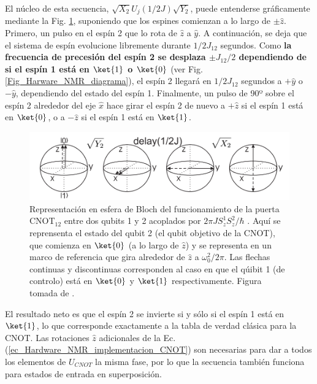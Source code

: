 El núcleo de esta secuencia, $\sqrt{X_2} U_j (1/2J) \sqrt{Y_2}$, puede entenderse gráficamente mediante la Fig. \ref{Fig_Harware_NMR_implementacion_CNOT}, suponiendo que los espines comienzan a lo largo de $\pm \hat{z}$. Primero, un pulso en el espín 2 que lo rota de $\hat{z}$ a $\hat{y}$. A continuación, se deja que el sistema de espín evolucione libremente durante $1/2J_{12}$ segundos. Como \textbf{la frecuencia de precesión del espín 2 se desplaza $\pm J_{12}/2$ dependiendo de si el espín 1 está en $\ket{1}$ o $\ket{0}$} (ver Fig. \ref{Fig_Harware_NMR_diagrama}), el espín 2 llegará en $1/2J_{12}$ segundos a $+\hat{y}$ o $- \hat{y}$, dependiendo del estado del espín 1. Finalmente, un pulso de 90º sobre el espín 2 alrededor del eje $\hat{x}$ hace girar el espín 2 de nuevo a $+\hat{z}$ si el espín 1 está en $\ket {0}$, o a $-\hat{z}$ si el espín 1 está en $\ket{1}$.

	\begin{figure}[H]
	\centering 
	\includegraphics[width=0.7\linewidth]{Figuras/Fig_Harware_NMR_implementacion_CNOT.png}
	\caption{Representación en esfera de Bloch del funcionamiento de la puerta CNOT$_{12}$ entre dos qubits 1 y 2 acoplados por $2 \pi J S_z^1S_z^2/\hbar$ . Aquí se reprensenta el estado del qubit 2 (el qubit objetivo de la CNOT), que comienza en $\ket{0}$ (a lo largo de $\hat{z}$) y se representa en un marco de referencia que gira alrededor de $\hat{z}$ a $\omega_0^2/2 \pi$. Las flechas continuas y discontinuas corresponden al caso en que el qúibit 1 (de controlo) está en $\ket{0}$ y $\ket{1}$ respectivamente. Figura tomada de \cite{bib_NMR_hardware}.}
	\label{Fig_Harware_NMR_implementacion_CNOT}
	\end{figure}

	


El resultado neto es que el espín 2 se invierte si y sólo si el espín 1 está en $\ket{1}$, lo que corresponde exactamente a la tabla de verdad clásica para la CNOT. Las rotaciones $\hat{z}$ adicionales de la Ec. (\ref{ec_Hardware_NMR_implementacion_CNOT}) son necesarias para dar a todos los elementos de $U_{CNOT}$ la misma fase, por lo que la secuencia también funciona para estados de entrada en superposición.

